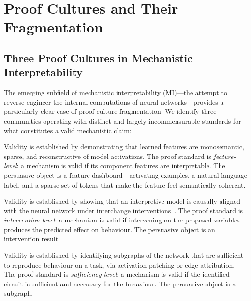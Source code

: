 \documentclass{article}
\begin{document}
\section{Proof Cultures and Their Fragmentation}
\label{sec:proof_cultures}

\subsection{Three Proof Cultures in Mechanistic Interpretability}

The emerging subfield of mechanistic interpretability (MI)---the attempt to reverse-engineer the internal computations of neural networks---provides a particularly clear case of proof-culture fragmentation. We identify three communities operating with distinct and largely incommensurable standards for what constitutes a valid mechanistic claim:

\begin{description}[leftmargin=*]
\item[Sparse autoencoders (SAE).] Validity is established by demonstrating that learned features are monosemantic, sparse, and reconstructive of model activations. The proof standard is \textit{feature-level}: a mechanism is valid if its component features are interpretable. The persuasive object is a feature dashboard---activating examples, a natural-language label, and a sparse set of tokens that make the feature feel semantically coherent.
\item[Causal abstraction.] Validity is established by showing that an interpretive model is causally aligned with the neural network under interchange interventions~\citep{geiger_causal_2021}. The proof standard is \textit{intervention-level}: a mechanism is valid if intervening on the proposed variables produces the predicted effect on behaviour. The persuasive object is an intervention result.
\item[Circuit discovery.] Validity is established by identifying subgraphs of the network that are sufficient to reproduce behaviour on a task, via activation patching or edge attribution. The proof standard is \textit{sufficiency-level}: a mechanism is valid if the identified circuit is sufficient and necessary for the behaviour. The persuasive object is a subgraph.
\end{description}
\end{document}
